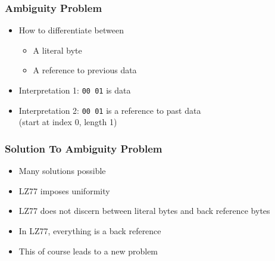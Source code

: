 \begin{frame}
  \frametitle{Ambiguity Problem}
  \begin{center}
  \end{center}

  \begin{itemize}
    \item How to differentiate between
          \begin{itemize}
            \item A literal byte
            \item A reference to previous data
          \end{itemize}
    \item Interpretation 1: {\tt 00 01} is data
    \item Interpretation 2: {\tt 00 01} is a reference to past data \\ (start at index 0, length 1)
  \end{itemize}
\end{frame}

\begin{frame}
  \frametitle{Solution To Ambiguity Problem}
  \begin{itemize}
    \item Many solutions possible
    \item LZ77 imposes uniformity
    \item LZ77 does not discern between literal bytes and back reference bytes
    \item In LZ77, everything is a back reference
    \item This of course leads to a new problem
  \end{itemize}
\end{frame}

